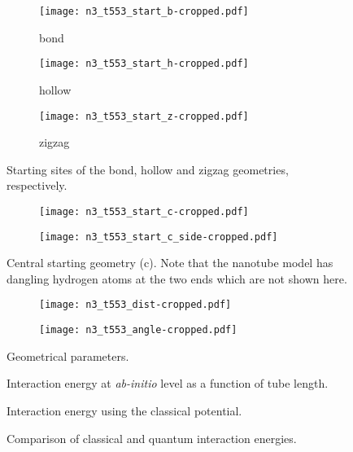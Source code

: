 \def\bfig#1#2{\expandafter\gdef\csname fig-#1\endcsname{\begin{figure}[ht]#2\label{#1}\end{figure}}}
\def\fref#1{\csname fig-#1\endcsname\Cref{#1}}

\bfig{fig:n3t553_start_sites}{
    \centering
    \begin{subfigure}{3cm}
        \texttt{[image: n3\_t553\_start\_b-cropped.pdf]}
        \caption{bond}
    \end{subfigure}
    \hspace{1cm}
    \begin{subfigure}{3cm}
        \texttt{[image: n3\_t553\_start\_h-cropped.pdf]}
        \caption{hollow}
    \end{subfigure}
    \hspace{1cm}
    \begin{subfigure}{3cm}
        \texttt{[image: n3\_t553\_start\_z-cropped.pdf]}
        \caption{zigzag}
    \end{subfigure}
    \caption{Starting sites of the bond, hollow and zigzag geometries, respectively.}
}

\bfig{fig:n3t553_start_center}{
    \centering
    \begin{subfigure}{3cm}
        \texttt{[image: n3\_t553\_start\_c-cropped.pdf]}
    \end{subfigure}
    \hspace{1cm}
    \begin{subfigure}{3cm}
        \texttt{[image: n3\_t553\_start\_c\_side-cropped.pdf]}
    \end{subfigure}
    \caption{Central starting geometry (c). Note that the nanotube model has dangling hydrogen atoms at the two ends which are not shown here.}
}

\bfig{fig:n3t553_geom_parms}{
    \centering
    \begin{subfigure}{4.7cm}
        \texttt{[image: n3\_t553\_dist-cropped.pdf]}
    \end{subfigure}
    \hspace{1cm}
    \begin{subfigure}{4cm}
        \texttt{[image: n3\_t553\_angle-cropped.pdf]}
    \end{subfigure}
    \caption{Geometrical parameters.}
}

\bfig{fig:n3t55x_ab-initio_eint}{
    \centering
    
    \caption{Interaction energy at \emph{ab-initio} level as a function of tube length.}
}

\bfig{fig:n3t55x_classical_eint}{
    \centering
    
    \caption{Interaction energy using the classical potential.}
}

\bfig{fig:n3t55x_comp_eint}{
    \centering
    
    \caption{Comparison of classical and quantum interaction energies.}
}
